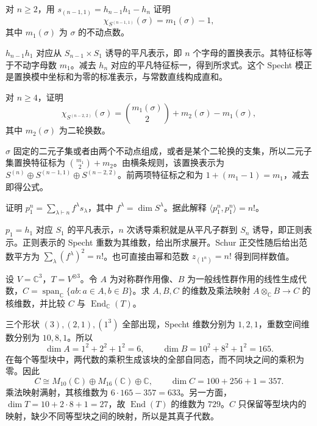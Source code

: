 \begin{exercise}\label{b5:ex:07-standard-character}
	对 \(n\ge2\)，用 \(s_{(n-1,1)}=h_{n-1}h_1-h_n\) 证明
	\[
		\chi_{S^{(n-1,1)}}(\sigma)=m_1(\sigma)-1,
	\]
	其中 \(m_1(\sigma)\) 为 \(\sigma\) 的不动点数。
\end{exercise}
\begin{solution}
	\(h_{n-1}h_1\) 对应从 \(S_{n-1}\times S_1\) 诱导的平凡表示，即 \(n\) 个字母的置换表示。其特征标等于不动字母数 \(m_1\)。减去 \(h_n\) 对应的平凡特征标一，得到所求式。这个 Specht 模正是置换模中坐标和为零的标准表示，与常数直线构成直和。
\end{solution}

\begin{exercise}\label{b5:ex:07-two-row-character}
	对 \(n\ge4\)，证明
	\[
		\chi_{S^{(n-2,2)}}(\sigma) =\binom{m_1(\sigma)}2+m_2(\sigma)-m_1(\sigma),
	\]
	其中 \(m_2(\sigma)\) 为二轮换数。
\end{exercise}
\begin{solution}
	\(\sigma\) 固定的二元子集或者由两个不动点组成，或者是某个二轮换的支集，所以二元子集置换特征标为 \(\binom{m_1}2+m_2\)。由横条规则，该置换表示为 \(S^{(n)}\oplus S^{(n-1,1)}\oplus S^{(n-2,2)}\)。前两项特征标之和为 \(1+(m_1-1)=m_1\)，减去即得公式。
\end{solution}

\begin{exercise}\label{b5:ex:07-regular-schur}
	证明 \(p_1^n=\sum_{\lambda\vdash n}f^\lambda s_\lambda\)，其中 \(f^\lambda=\dim S^\lambda\)。据此解释 \(\langle p_1^n,p_1^n\rangle=n!\)。
\end{exercise}
\begin{solution}
	\(p_1=h_1\) 对应 \(S_1\) 的平凡表示，\(n\) 次诱导乘积就是从平凡子群到 \(S_n\) 诱导，即正则表示。正则表示的 Specht 重数为其维数，给出所求展开。Schur 正交性随后给出范数平方为 \(\sum_\lambda(f^\lambda)^2=n!\)。也可直接由幂和范数 \(z_{(1^n)}=n!\) 得到同样数值。
\end{solution}

\begin{exercise}\label{b5:ex:07-centralizer-dimensions}
	设 \(V=\mathbb C^3\)，\(T=V^{\otimes3}\)。令 \(A\) 为对称群作用像、\(B\) 为一般线性群作用的线性生成代数，\(C=\operatorname{span}_{\mathbb C}\{ab:a\in A,b\in B\}\)。求 \(A,B,C\) 的维数及乘法映射 \(A\otimes_{\mathbb C}B\to C\) 的核维数，并比较 \(C\) 与 \(\operatorname{End}_{\mathbb C}(T)\)。
\end{exercise}
\begin{solution}
	三个形状 \((3),(2,1),(1^3)\) 全部出现，Specht 维数分别为 \(1,2,1\)，重数空间维数分别为 \(10,8,1\)。所以
	\[
		\dim A=1^2+2^2+1^2=6,\qquad \dim B=10^2+8^2+1^2=165.
	\]
	在每个等型块中，两代数的乘积生成该块的全部自同态，而不同块之间的乘积为零。因此
	\[
		C\cong M_{10}(\mathbb C)\oplus M_{16}(\mathbb C)\oplus\mathbb C, \qquad \dim C=100+256+1=357.
	\]
	乘法映射满射，其核维数为 \(6\cdot165-357=633\)。另一方面，\(\dim T=10+2\cdot8+1=27\)，故 \(\operatorname{End}(T)\) 的维数为 \(729\)。\(C\) 只保留等型块内的映射，缺少不同等型块之间的映射，所以是其真子代数。
\end{solution}

